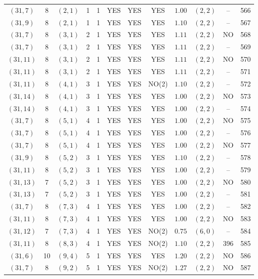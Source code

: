 \begin{longtable}{|c|c|c|c|c|c|c|c|c|c|c|c|}
$(31,7)$ & 8 & $(2,1)$ & 1 & 1 & YES & YES & YES & $1.00$ & $(2,2)$ & -- & 566\\
$(31,9)$ & 8 & $(2,1)$ & 1 & 1 & YES & YES & YES & $1.10$ & $(2,2)$ & -- & 567\\
$(31,7)$ & 8 & $(3,1)$ & 2 & 1 & YES & YES & YES & $1.11$ & $(2,2)$ & NO & 568\\
$(31,7)$ & 8 & $(3,1)$ & 2 & 1 & YES & YES & YES & $1.11$ & $(2,2)$ & -- & 569\\
$(31,11)$ & 8 & $(3,1)$ & 2 & 1 & YES & YES & YES & $1.11$ & $(2,2)$ & NO & 570\\
$(31,11)$ & 8 & $(3,1)$ & 2 & 1 & YES & YES & YES & $1.11$ & $(2,2)$ & -- & 571\\
$(31,11)$ & 8 & $(4,1)$ & 3 & 1 & YES & YES & NO(2) & $1.10$ & $(2,2)$ & -- & 572\\
$(31,14)$ & 8 & $(4,1)$ & 3 & 1 & YES & YES & YES & $1.00$ & $(2,2)$ & NO & 573\\
$(31,14)$ & 8 & $(4,1)$ & 3 & 1 & YES & YES & YES & $1.00$ & $(2,2)$ & -- & 574\\
$(31,7)$ & 8 & $(5,1)$ & 4 & 1 & YES & YES & YES & $1.00$ & $(2,2)$ & NO & 575\\
$(31,7)$ & 8 & $(5,1)$ & 4 & 1 & YES & YES & YES & $1.00$ & $(2,2)$ & -- & 576\\
$(31,7)$ & 8 & $(5,1)$ & 4 & 1 & YES & YES & YES & $1.00$ & $(2,2)$ & NO & 577\\
$(31,9)$ & 8 & $(5,2)$ & 3 & 1 & YES & YES & YES & $1.10$ & $(2,2)$ & -- & 578\\
$(31,11)$ & 8 & $(5,2)$ & 3 & 1 & YES & YES & YES & $1.00$ & $(2,2)$ & -- & 579\\
$(31,13)$ & 7 & $(5,2)$ & 3 & 1 & YES & YES & YES & $1.00$ & $(2,2)$ & NO & 580\\
$(31,13)$ & 7 & $(5,2)$ & 3 & 1 & YES & YES & YES & $1.00$ & $(2,2)$ & -- & 581\\
$(31,7)$ & 8 & $(7,3)$ & 4 & 1 & YES & YES & YES & $1.00$ & $(2,2)$ & -- & 582\\
$(31,11)$ & 8 & $(7,3)$ & 4 & 1 & YES & YES & YES & $1.00$ & $(2,2)$ & NO & 583\\
$(31,12)$ & 7 & $(7,3)$ & 4 & 1 & YES & YES & NO(2) & $0.75$ & $(6,0)$ & -- & 584\\
$(31,11)$ & 8 & $(8,3)$ & 4 & 1 & YES & YES & NO(2) & $1.10$ & $(2,2)$ & 396 & 585\\
$(31,6)$ & 10 & $(9,4)$ & 5 & 1 & YES & YES & YES & $1.20$ & $(2,2)$ & NO & 586\\
$(31,7)$ & 8 & $(9,2)$ & 5 & 1 & YES & YES & NO(2) & $1.27$ & $(2,2)$ & NO & 587\\

\end{longtable}
